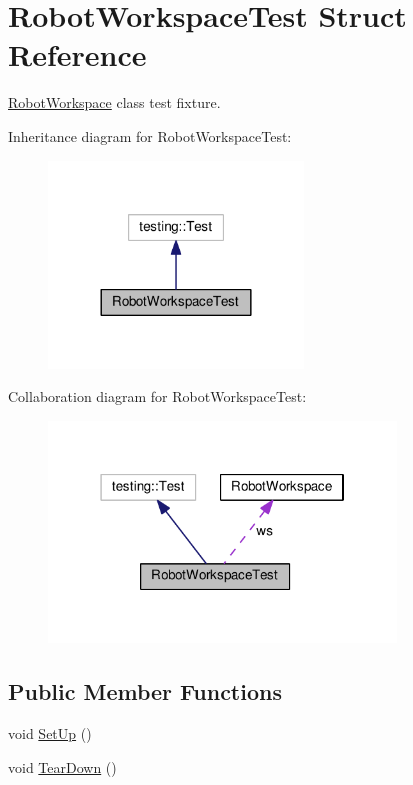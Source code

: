 \hypertarget{structRobotWorkspaceTest}{}\section{Robot\+Workspace\+Test Struct Reference}
\label{structRobotWorkspaceTest}


\hyperlink{classRobotWorkspace}{Robot\+Workspace} class test fixture.  




Inheritance diagram for Robot\+Workspace\+Test\+:\nopagebreak
\begin{figure}[H]
\begin{center}
\leavevmode
\includegraphics[width=192pt]{structRobotWorkspaceTest__inherit__graph}
\end{center}
\end{figure}


Collaboration diagram for Robot\+Workspace\+Test\+:\nopagebreak
\begin{figure}[H]
\begin{center}
\leavevmode
\includegraphics[width=262pt]{structRobotWorkspaceTest__coll__graph}
\end{center}
\end{figure}
\subsection*{Public Member Functions}
\begin{DoxyCompactItemize}
\item 
void \hyperlink{structRobotWorkspaceTest_a2139bb8873c63aacf5096b299a639d96}{Set\+Up} ()
\item 
void \hyperlink{structRobotWorkspaceTest_a59c52221366f68ed23bd7db4a8c2925c}{Tear\+Down} ()
\end{DoxyCompactItemize}
